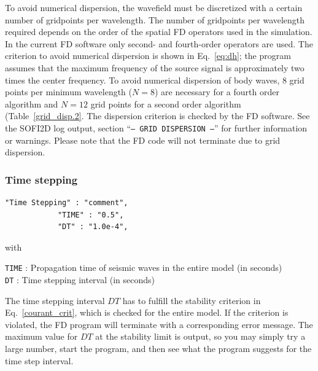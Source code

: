 To avoid numerical dispersion, the wavefield must be discretized with a certain number of gridpoints per wavelength. The number of gridpoints per wavelength required depends on the order of the spatial FD operators used in the simulation. In the current FD software only second- and fourth-order operators are used. The criterion to avoid numerical dispersion is shown in Eq.~\ref{eq:dh}; the program assumes that the maximum frequency of the source signal is approximately two times the center frequency. To avoid numerical dispersion of body waves, 8 grid points per minimum wavelength ($N=8$) are necessary for a fourth order algorithm and $N=12$ grid points for a second order algorithm (Table~\ref{grid_disp.2}. The dispersion criterion is checked by the FD software. See the SOFI2D log output, section \enquote{\texttt{--- GRID DISPERSION ---}} for further information or warnings. Please note that the FD code will not terminate due to grid dispersion.

\subsubsection{Time stepping}
\begin{verbatim}
"Time Stepping" : "comment",
			"TIME" : "0.5",
			"DT" : "1.0e-4",
\end{verbatim}

with

\texttt{TIME} : Propagation time of seismic waves in the entire model (in seconds)\\
\texttt{DT} : Time stepping interval (in seconds)

The time stepping interval $DT$ has to fulfill the stability criterion in Eq.~\ref{courant_crit}, which is checked for the entire model. If the criterion is violated, the FD program will terminate with a corresponding error message. The maximum value for $DT$ at the stability limit is output, so you may simply try a large number, start the program, and then see what the program suggests for the time step interval.

